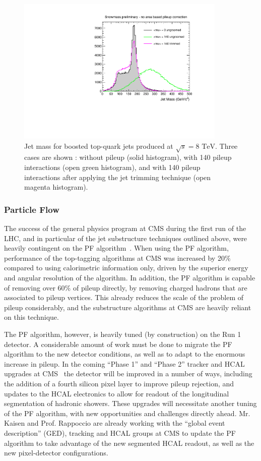 \documentclass[12pt]{proposalnsf}
\newcommand{\TeV}{\ensuremath{\mathrm{TeV}}}
\begin{document}
\begin{figure}[h!]
    \centering
    \includegraphics[width=100mm]{jetmass_toptags_trimming}
    \caption{\label{jetmass_toptags_trimming} Jet mass for boosted
      top-quark jets produced at $\sqrt{s} = 8$ \TeV. Three cases are
      shown : without pileup (solid histogram), with 140 pileup
      interactions (open green histogram), and with 140 pileup
      interactions after applying the jet trimming technique (open
      magenta histogram).}
\end{figure}



\subsubsection{Particle Flow}
\label{sec:pf}

The success of the general physics program at CMS during
the first run of the LHC, and in particular of the jet substructure
techniques outlined above, were heavily contingent on the
PF algorithm~\cite{particleflow}. 
When using the PF algorithm, performance of the top-tagging
algorithms at CMS was increased by 20\% compared to using calorimetric
information only, driven by the superior energy
and angular resolution of the algorithm. In addition, the PF algorithm
is capable of removing
over 60\% of pileup directly, by removing charged hadrons that are
associated to pileup vertices. This already reduces the scale of the
problem of pileup considerably, and the substructure algorithms at CMS
are heavily reliant on this technique. 

The PF algorithm, however, is heavily tuned (by construction) on the
Run 1 detector. A considerable amount of work must be done to migrate
the PF algorithm to the new detector conditions, as well as to adapt
to the enormous increase in pileup.
In the coming ``Phase 1'' and ``Phase 2''
tracker and HCAL upgrades at CMS~\cite{Dominguez:1481838,Mans:1481837}
the detector will be improved in a number of ways, including the
addition of a fourth silicon pixel layer to improve pileup
rejection, and
updates to the HCAL electronics to allow for readout of the
longitudinal segmentation of hadronic showers. These upgrades will
necessitate another tuning of the PF
algorithm, with new opportunities and challenges directly
ahead. Mr. Kaisen and Prof. Rappoccio are already working with the
``global event description'' (GED), tracking and HCAL groups at CMS to
update the PF algorithm to take advantage of the new segmented HCAL
readout, as well as the new pixel-detector configurations. 
\end{document}
